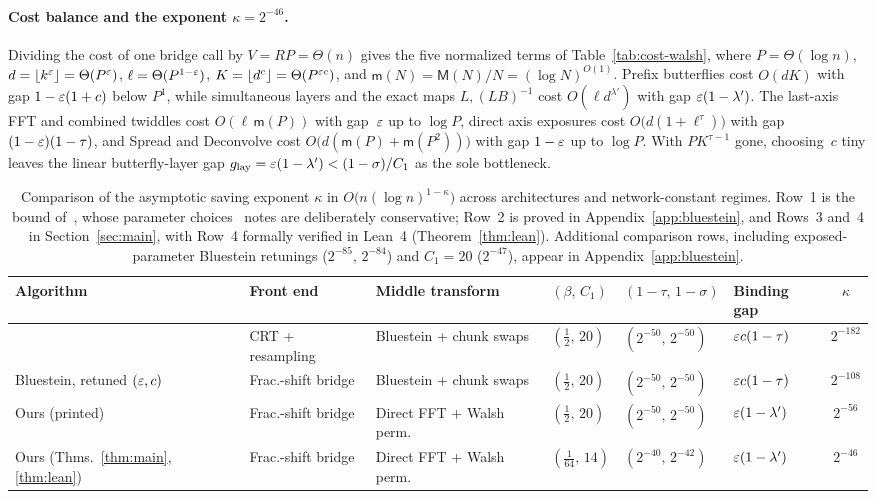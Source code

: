\paragraph{Cost balance and the exponent $\kappa=2^{-46}$.}\label{sec:intro-comparison}\label{sec:intro-kappa}
Dividing the cost of one bridge call by $V=RP=\Theta(n)$ gives the five normalized terms of Table~\ref{tab:cost-walsh}, where $P=\Theta(\log n)$, $d=\lfloor k^\varepsilon\rfloor=\Theta(P^\varepsilon)$, $\ell=\Theta(P^{1-\varepsilon})$, $K=\lfloor d^c\rfloor=\Theta(P^{\varepsilon c})$, and $\mathsf m(N)=\mathsf M(N)/N=(\log N)^{O(1)}$. Prefix butterflies cost $O(dK)$ with gap $1-\varepsilon(1+c)$ below $P^1$, while simultaneous layers and the exact maps $L,(LB)^{-1}$ cost $O(\ell d^{\lambda'})$ with gap $\varepsilon(1-\lambda')$. The last-axis FFT and combined twiddles cost $O(\ell\,\mathsf m(P))$ with gap~$\varepsilon$ up to $\log P$, direct axis exposures cost $O\bigl(d(1+\ell^\tau)\bigr)$ with gap $(1-\varepsilon)(1-\tau)$, and \textsf{Spread} and \textsf{Deconvolve} cost $O\bigl(d(\mathsf m(P)+\mathsf m(P^2))\bigr)$ with gap $1-\varepsilon$ up to $\log P$. With $P K^{\tau-1}$ gone, choosing~$c$ tiny leaves the linear butterfly-layer gap $g_{\mathrm{lay}}=\varepsilon(1-\lambda') < (1-\sigma)/C_1$ as the sole bottleneck.

\begin{table}[!ht]
\setlength{\abovecaptionskip}{2pt}
\setlength{\belowcaptionskip}{3pt}
\centering
\footnotesize
\caption{Comparison of the asymptotic saving exponent $\kappa$ in $O\bigl(n(\log n)^{1-\kappa}\bigr)$ across architectures and network-constant regimes. Row~1 is the bound of~\cite{OAI26}, whose parameter choices~\cite[\S9.1]{OAI26} notes are deliberately conservative; Row~2 is proved in Appendix~\ref{app:bluestein}, and Rows~3 and~4 in Section~\ref{sec:main}, with Row~4 formally verified in Lean~4 (Theorem~\ref{thm:lean}). Additional comparison rows, including exposed-parameter Bluestein retunings ($2^{-85}$, $2^{-84}$) and $C_1=20$ ($2^{-47}$), appear in Appendix~\ref{app:bluestein}.}
\label{tab:kappa}\label{tab:exponents}
\setlength{\tabcolsep}{2.1pt}
\begin{tabular}{@{}llllllc@{}}
\toprule
Algorithm & Front end & Middle transform & $(\beta,\,C_1)$ & $(1-\tau,\,1-\sigma)$ & Binding gap & $\kappa$ \\
\midrule
\cite{OAI26} & CRT + resampling & Bluestein + chunk swaps & $(\frac12,\,20)$ & $(2^{-50},\,2^{-50})$ & $\varepsilon c(1-\tau)$ & $2^{-182}$ \\
Bluestein, retuned $(\varepsilon,c)$ & Frac.-shift bridge & Bluestein + chunk swaps & $(\frac12,\,20)$ & $(2^{-50},\,2^{-50})$ & $\varepsilon c(1-\tau)$ & $2^{-108}$ \\
Ours (printed) & Frac.-shift bridge & Direct FFT + Walsh perm. & $(\frac12,\,20)$ & $(2^{-50},\,2^{-50})$ & $\varepsilon(1-\lambda')$ & $2^{-56}$ \\
Ours (Thms.~\ref{thm:main}, \ref{thm:lean}) & Frac.-shift bridge & Direct FFT + Walsh perm. & $(\frac1{64},\,14)$ & $(2^{-40},\,2^{-42})$ & $\varepsilon(1-\lambda')$ & $2^{-46}$ \\
\bottomrule
\end{tabular}
\end{table}

